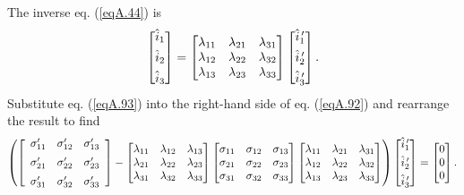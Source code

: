 \documentclass{AeroStructure-ERJohnson}
\begin{document}
The inverse eq. (\ref{eqA.44}) is
\begin{align}\label{eqA.93}
\left[\begin{array}{@{}l@{}}\hat{i}_{1} \\[4pt] \hat{i}_{2} \\[4pt] \hat{i}_{3}\end{array}\right]=\left[\begin{array}{@{}lll@{}}\lambda_{11} & \lambda_{21} & \lambda_{31} \\\lambda_{12} & \lambda_{22} & \lambda_{32} \\\lambda_{13} & \lambda_{23} & \lambda_{33}\end{array}\right]\left[\begin{array}{@{}l@{}}\hat{i}_{1}^{\,\prime} \\[4pt] \hat{i}_{2}^{\,\prime} \\[4pt] \hat{i}_{3}^{\,\prime}\end{array}\right].
\end{align}
Substitute eq. (\ref{eqA.93}) into the right-hand side of eq. (\ref{eqA.92}) and rearrange the result to find
\begin{align}\label{eqA.94}
\left(\left[\begin{array}{ccc}
\sigma_{11}^{\prime} & \sigma_{12}^{\prime} & \sigma_{13}^{\prime} \\[5pt]\sigma_{21}^{\prime} & \sigma_{22}^{\prime} & \sigma_{23}^{\prime} \\[5pt]\sigma_{31}^{\prime} & \sigma_{32}^{\prime} & \sigma_{33}^{\prime}\end{array}\right]-\left[\begin{array}{@{}lll@{}}\lambda_{11} & \lambda_{12} & \lambda_{13} \\\lambda_{21} & \lambda_{22} & \lambda_{23} \\\lambda_{31} & \lambda_{32} & \lambda_{33}\end{array}\right]\left[\begin{array}{@{}lll@{}}\sigma_{11} & \sigma_{12} & \sigma_{13} \\\sigma_{21} & \sigma_{22} & \sigma_{23} \\\sigma_{31} & \sigma_{32} & \sigma_{33}\end{array}\right]\left[\begin{array}{@{}lll@{}}\lambda_{11} & \lambda_{21} & \lambda_{31} \\\lambda_{12} & \lambda_{22} & \lambda_{32} \\\lambda_{13} & \lambda_{23} & \lambda_{33}\end{array}\right]\right)\left[\begin{array}{@{}l@{}}\hat{i}_{1}^{\,\prime} \\[4pt] \hat{i}_{2}^{\,\prime} \\[4pt] \hat{i}_{3}^{\,\prime}\end{array}\right]=\left[\begin{array}{@{}l@{}}0 \\0 \\0\end{array}\right].
\end{align}
\end{document}
